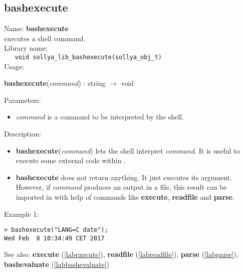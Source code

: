 \subsection{bashexecute}
\label{labbashexecute}
\noindent Name: \textbf{bashexecute}\\
\phantom{aaa}executes a shell command.\\[0.2cm]
\noindent Library name:\\
\verb|   void sollya_lib_bashexecute(sollya_obj_t)|\\[0.2cm]
\noindent Usage: 
\begin{center}
\textbf{bashexecute}(\emph{command}) : \textsf{string} $\rightarrow$ \textsf{void}\\
\end{center}
Parameters: 
\begin{itemize}
\item \emph{command} is a command to be interpreted by the shell.
\end{itemize}
\noindent Description: \begin{itemize}

\item \textbf{bashexecute}(\emph{command}) lets the shell interpret \emph{command}. It is useful to execute
   some external code within \sollya.

\item \textbf{bashexecute} does not return anything. It just executes its argument. However, if
   \emph{command} produces an output in a file, this result can be imported in \sollya
   with help of commands like \textbf{execute}, \textbf{readfile} and \textbf{parse}.
\end{itemize}
\noindent Example 1: 
\begin{center}\begin{minipage}{15cm}\begin{Verbatim}[frame=single]
> bashexecute("LANG=C date");
Wed Feb  8 10:34:49 CET 2017
\end{Verbatim}
\end{minipage}\end{center}
See also: \textbf{execute} (\ref{labexecute}), \textbf{readfile} (\ref{labreadfile}), \textbf{parse} (\ref{labparse}), \textbf{bashevaluate} (\ref{labbashevaluate})
